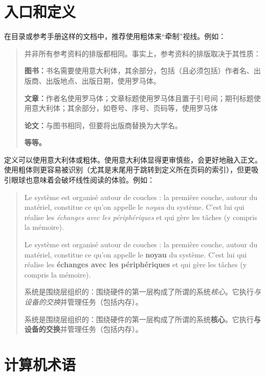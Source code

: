 \section{入口和定义}

在目录或参考手册这样的文档中，推荐使用粗体来“牵制”视线。例如：

\begin{quote}
    并非所有参考资料的排版都相同。事实上，参考资料的排版取决于其性质：

    \textbf{图书：}书名需要使用意大利体，其余部分，包括（且必须包括）作者名、出版商、出版地点、出版日期，使用罗马体。
    
    \textbf{文章：}作者名使用罗马体；文章标题使用罗马体且置于引号间；期刊标题使用意大利体；其余部分，如卷号、序号、页码等，使用罗马体

    \textbf{论文：}与图书相同，但要将出版商替换为大学名。

    \textbf{等等。}
\end{quote}

定义可以使用意大利体或粗体。使用意大利体显得更审慎些，会更好地融入正文。使用粗体则更容易被识别（尤其是末尾用于跳转到定义所在页码的索引），但更吸引眼球也意味着会破坏线性阅读的体验。例如：

\begin{quote}
    Le système est organisé autour de couches : la première couche, autour du matériel, constitue ce qu’on appelle le \emph{noyau} du système. C’est lui qui réalise les \emph{échanges avec les périphériques} et qui gère les tâches (y compris la mémoire).

    Le système est organisé autour de couches : la première couche, autour du matériel, constitue ce qu’on appelle le \textbf{noyau} du système. C’est lui qui réalise les \textbf{échanges avec les périphériques} et qui gère les tâches (y compris la mémoire).

    \begin{bil}
        系统是围绕层组织的：围绕硬件的第一层构成了所谓的系统\emph{核心}。它执行\emph{与设备的交换}并管理任务（包括内存）。

        系统是围绕层组织的：围绕硬件的第一层构成了所谓的系统\textbf{核心}。它执行\textbf{与设备的交换}并管理任务（包括内存）。
    \end{bil}
\end{quote}

\section{计算机术语}

